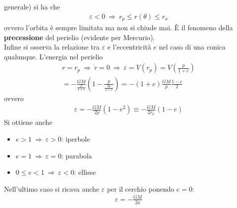 \documentclass[a4paper, oneside]{book}
\begin{document}
generale) si ha che 
\begin{gather*}
    \varepsilon < 0 \ \Longrightarrow \ r_p \leq r(\theta ) \leq r_a 
\end{gather*}
ovvero l'orbita è sempre limitata ma non si chiude mai. È il fenomeno della 
\textbf{precessione} del perielio (evidente per Mercurio). \\
Infine si osserva la relazione tra $\varepsilon$ e l'eccentricità $e$ nel 
caso di una conica qualunque. L'energia nel perielio
\begin{gather*}
    r = r_p \ \Longrightarrow \ \dot{r} = 0 \ \Longrightarrow \ \varepsilon = V(r_p) = V\left(\frac{p}{1 + e}\right) \\
    = - \frac{GM}{\frac{p}{1 + e}} \left(1 - \frac{p}{\frac{2p}{1 + e}}\right) = -(1 + e)\frac{GM}{p} \frac{1 - e}{2} 
\end{gather*}
ovvero 
\begin{align}
    \boxed{\varepsilon = - \frac{GM}{2p} (1 - e^{2}) \equiv - \frac{GM}{2r_p}(1 - e)}
\end{align}
Si ottiene anche
\begin{itemize}
    \item $e > 1 \ \Longrightarrow \ \varepsilon > 0$: iperbole
    \item $e = 1 \ \Longrightarrow \ \varepsilon = 0$: parabola
    \item $0 \leq e < 1 \ \Longrightarrow \ \varepsilon < 0$: ellisse 
\end{itemize}
Nell'ultimo caso si ricava anche $\varepsilon$ per il cerchio ponendo $e = 0$:
\begin{gather*}
    \varepsilon = - \frac{GM}{2a}
\end{gather*}
\end{document}
